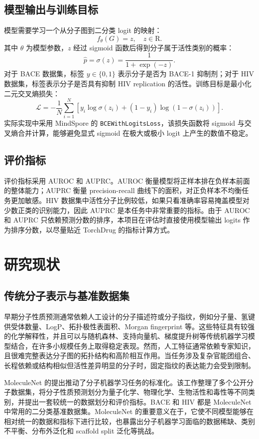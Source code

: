 \documentclass[12pt,hyperref,a4paper,UTF8]{ctexart}
\begin{document}
\subsection{模型输出与训练目标}

模型需要学习一个从分子图到二分类 logit 的映射：
\[
f_{\theta}(G)=z,\quad z\in\mathrm{R}.
\]
其中 $\theta$ 为模型参数，$z$ 经过 sigmoid 函数后得到分子属于活性类别的概率：
\[
\hat{p}=\sigma(z)=\frac{1}{1+\exp(-z)}.
\]
对于 BACE 数据集，标签 $y\in\{0,1\}$ 表示分子是否为 BACE-1 抑制剂；对于 HIV 数据集，标签表示分子是否具有抑制 HIV replication 的活性。训练目标是最小化二元交叉熵损失：
\[
\mathcal{L}
=-\frac{1}{N}\sum_{i=1}^{N}
\left[y_i\log\sigma(z_i)+(1-y_i)\log(1-\sigma(z_i))\right].
\]
实际实现中采用 MindSpore 的 \texttt{BCEWithLogitsLoss}，该损失函数将 sigmoid 与交叉熵合并计算，能够避免显式 sigmoid 在极大或极小 logit 上产生的数值不稳定。

\subsection{评价指标}

评价指标采用 AUROC 和 AUPRC。AUROC 衡量模型将正样本排在负样本前面的整体能力；AUPRC 衡量 precision-recall 曲线下的面积，对正负样本不均衡任务更加敏感。HIV 数据集中活性分子比例较低，如果只看准确率容易掩盖模型对少数正类的识别能力，因此 AUPRC 是本任务中非常重要的指标。由于 AUROC 和 AUPRC 只依赖预测分数的排序，本项目在评估时直接使用模型输出 logits 作为排序分数，以尽量贴近 TorchDrug 的指标计算方式。

\section{研究现状}

\subsection{传统分子表示与基准数据集}

早期分子性质预测通常依赖人工设计的分子描述符或分子指纹，例如分子量、氢键供受体数量、LogP、拓扑极性表面积、Morgan fingerprint 等。这些特征具有较强的化学解释性，并且可以与随机森林、支持向量机、梯度提升树等传统机器学习模型结合，在许多小规模任务上取得稳定表现。然而，人工特征通常依赖专家知识，且很难完整表达分子图的拓扑结构和高阶相互作用。当任务涉及复杂官能团组合、长程依赖或结构相似但活性差异明显的分子时，固定指纹的表达能力会受到限制。

MoleculeNet\cite{moleculenet} 的提出推动了分子机器学习任务的标准化。该工作整理了多个公开分子数据集，将分子性质预测划分为量子化学、物理化学、生物活性和毒性等不同类别，并提出一套较统一的数据划分和评价指标。BACE 和 HIV 都是 MoleculeNet 中常用的二分类基准数据集。MoleculeNet 的重要意义在于，它使不同模型能够在相对统一的数据和指标下进行比较，也暴露出分子机器学习面临的数据稀缺、类别不平衡、分布外泛化和 scaffold split 泛化等挑战。
\end{document}
